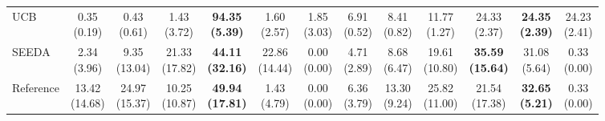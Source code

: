 {\begin{tabular}{l|cccccc|cccccc}
UCB & \makecell{0.35 \\ (0.19)} & \makecell{0.43 \\ (0.61)} & \makecell{1.43 \\ (3.72)} & {\cellcolor[HTML]{C8E6C9}} \bfseries \makecell{94.35 \\ (5.39)} & \makecell{1.60 \\ (2.57)} & \makecell{1.85 \\ (3.03)} & \makecell{6.91 \\ (0.52)} & \makecell{8.41 \\ (0.82)} & \makecell{11.77 \\ (1.27)} & {\cellcolor[HTML]{C8E6C9}} \makecell{24.33 \\ (2.37)} & \bfseries \makecell{24.35 \\ (2.39)} & \makecell{24.23 \\ (2.41)} \\
SEEDA & \makecell{2.34 \\ (3.96)} & \makecell{9.35 \\ (13.04)} & \makecell{21.33 \\ (17.82)} & {\cellcolor[HTML]{C8E6C9}} \bfseries \makecell{44.11 \\ (32.16)} & \makecell{22.86 \\ (14.44)} & \makecell{0.00 \\ (0.00)} & \makecell{4.71 \\ (2.89)} & \makecell{8.68 \\ (6.47)} & \makecell{19.61 \\ (10.80)} & {\cellcolor[HTML]{C8E6C9}} \bfseries \makecell{35.59 \\ (15.64)} & \makecell{31.08 \\ (5.64)} & \makecell{0.33 \\ (0.00)} \\
Reference & \makecell{13.42 \\ (14.68)} & \makecell{24.97 \\ (15.37)} & \makecell{10.25 \\ (10.87)} & {\cellcolor[HTML]{C8E6C9}} \bfseries \makecell{49.94 \\ (17.81)} & \makecell{1.43 \\ (4.79)} & \makecell{0.00 \\ (0.00)} & \makecell{6.36 \\ (3.79)} & \makecell{13.30 \\ (9.24)} & \makecell{25.82 \\ (11.00)} & {\cellcolor[HTML]{C8E6C9}} \makecell{21.54 \\ (17.38)} & \bfseries \makecell{32.65 \\ (5.21)} & \makecell{0.33 \\ (0.00)} \\

\end{tabular}}
